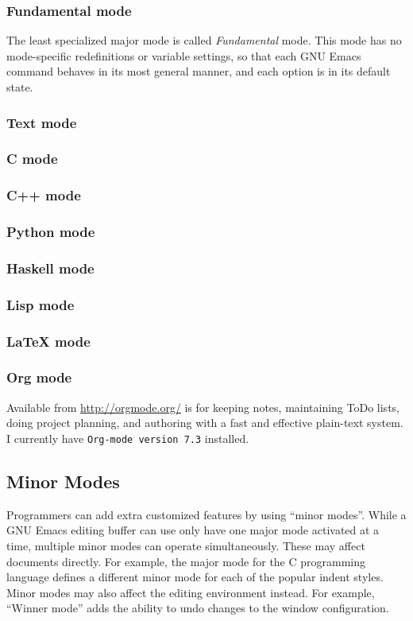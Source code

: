 \documentclass[12pt,a4paper,oneside]{article}
\begin{document}
\subsubsection{Fundamental mode}
The least specialized major mode is called \emph{Fundamental} mode. This mode has no mode-specific redefinitions or variable settings, so that each GNU Emacs command behaves in its most general manner, and each option is in its default state.

\subsubsection{Text mode}
\subsubsection{C mode}
\subsubsection{C++ mode}
\subsubsection{Python mode}
\subsubsection{Haskell mode}
\subsubsection{Lisp mode}
\subsubsection{{\LaTeX} mode}
\subsubsection{Org mode}
Available from \url{http://orgmode.org/} is for keeping notes, maintaining ToDo lists, doing project planning, and authoring with a fast and effective plain-text system.\\

I currently have \texttt{Org-mode version 7.3} installed.

\subsection{Minor Modes}
Programmers can add extra customized features by using ``minor modes''. While a GNU Emacs editing buffer can use only have one major mode activated at a time, multiple minor modes can operate simultaneously. These may affect documents directly. For example, the major mode for the C programming language defines a different minor mode for each of the popular indent styles. Minor modes may also affect the editing environment instead. For example, ``Winner mode'' adds the ability to undo changes to the window configuration.\\
\end{document}
